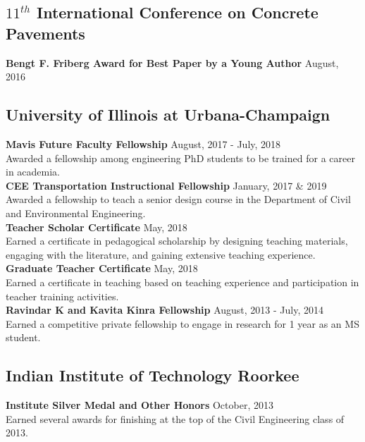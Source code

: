 \documentclass[12pt]{article}
\begin{document}
\subsection*{$11^{th}$ International Conference on Concrete Pavements}
\textbf{Bengt F. Friberg Award for Best Paper by a Young Author} \hfill August, 2016  \\

\subsection*{University of Illinois at Urbana-Champaign} 
\textbf{Mavis Future Faculty Fellowship} \hfill August, 2017 - July, 2018 \\
Awarded a fellowship among engineering PhD students to be trained for a career in academia. \\

\textbf{CEE Transportation Instructional Fellowship} \hfill January, 2017 \& 2019 \\
Awarded a fellowship to teach a senior design course in the Department of Civil and Environmental Engineering. \\

\textbf{Teacher Scholar Certificate} \hfill May, 2018 \\
Earned a certificate in pedagogical scholarship by designing teaching materials, engaging with the literature, and gaining extensive teaching experience. \\

\textbf{Graduate Teacher Certificate} \hfill May, 2018 \\
Earned a certificate in teaching based on teaching experience and participation in teacher training activities. \\

\textbf{Ravindar K and Kavita Kinra Fellowship} \hfill August, 2013 - July, 2014 \\
Earned a competitive private fellowship to engage in research for 1 year as an MS student. \\

\subsection*{Indian Institute of Technology Roorkee} 
\textbf{Institute Silver Medal and Other Honors} \hfill October, 2013 \\
Earned several awards for finishing at the top of the Civil Engineering class of 2013. \\
\end{document}
